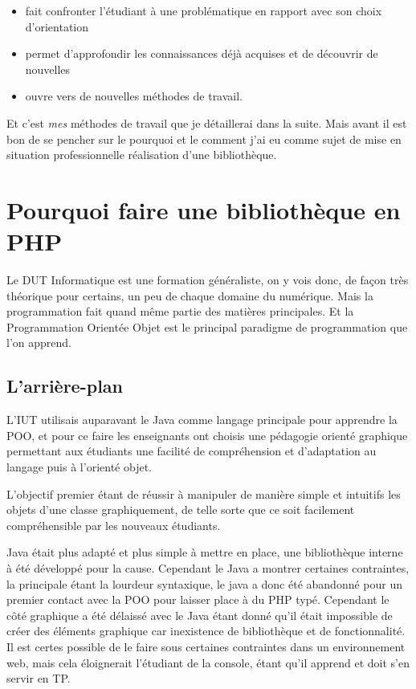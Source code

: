 \documentclass[11pt,a4paper,krantz2,11pt,oneside]{krantz}
\providecommand{\tightlist}{%
  \setlength{\itemsep}{0pt}\setlength{\parskip}{0pt}}
\begin{document}
\begin{itemize}
\tightlist
\item
  fait confronter l'étudiant à une problématique en rapport avec son choix d'orientation
\item
  permet d'approfondir les connaissances déjà acquises et de découvrir de nouvelles
\item
  ouvre vers de nouvelles méthodes de travail.
\end{itemize}

Et c'est \emph{mes} méthodes de travail que je détaillerai dans la suite. Mais avant il est bon de se pencher sur le pourquoi et le comment j'ai eu comme sujet de mise en situation professionnelle réalisation d'une bibliothèque.

\hypertarget{pourquoi-faire-une-bibliothuxe8que-en-php}{%
\section{Pourquoi faire une bibliothèque en PHP}\label{pourquoi-faire-une-bibliothuxe8que-en-php}}

Le DUT Informatique est une formation généraliste, on y vois donc, de façon très théorique pour certains, un peu de chaque domaine du numérique. Mais la programmation fait quand même partie des matières principales. Et la Programmation Orientée Objet est le principal paradigme de programmation que l'on apprend.

\hypertarget{larriuxe8re-plan}{%
\subsection{L'arrière-plan}\label{larriuxe8re-plan}}

L'IUT utilisais auparavant le Java comme langage principale pour apprendre la POO, et pour ce faire les enseignants ont choisis une pédagogie orienté graphique permettant aux étudiants une facilité de compréhension et d'adaptation au langage puis à l'orienté objet.

L'objectif premier étant de réussir à manipuler de manière simple et intuitifs les objets d'une classe graphiquement, de telle sorte que ce soit facilement compréhensible par les nouveaux étudiants.

Java était plus adapté et plus simple à mettre en place, une bibliothèque interne à été développé pour la cause. Cependant le Java a montrer certaines contraintes, la principale étant la lourdeur syntaxique, le java a donc été abandonné pour un premier contact avec la POO pour laisser place à du PHP typé. Cependant le côté graphique a été délaissé avec le Java étant donné qu'il était impossible de créer des éléments graphique car inexistence de bibliothèque et de fonctionnalité. Il est certes possible de le faire sous certaines contraintes dans un environnement web, mais cela éloignerait l'étudiant de la console, étant qu'il apprend et doit s'en servir en TP.
\end{document}

